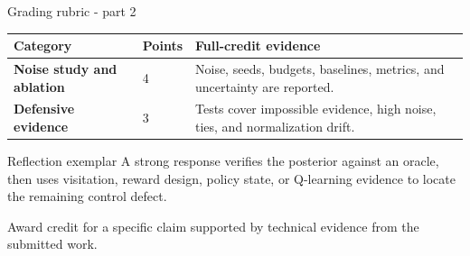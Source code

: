 \documentclass[aspectratio=169,11pt]{beamer}
\begin{document}
\begin{frame}{Grading rubric - part 2}
\scriptsize
\begin{tabularx}{\textwidth}{>{\bfseries}p{} p{} X}
\toprule
Category & Points & Full-credit evidence \\
\midrule
Noise study and ablation & 4 & Noise, seeds, budgets, baselines, metrics, and uncertainty are reported. \\
Defensive evidence & 3 & Tests cover impossible evidence, high noise, ties, and normalization drift. \\
\bottomrule
\end{tabularx}
\end{frame}

\begin{frame}{Reflection exemplar}
\small
\answerlabel A strong response verifies the posterior against an oracle, then uses visitation, reward design, policy state, or Q-learning evidence to locate the remaining control defect.

\vspace{0.25cm}
\gradinglabel Award credit for a specific claim supported by technical evidence from the submitted work.
\end{frame}
\end{document}
